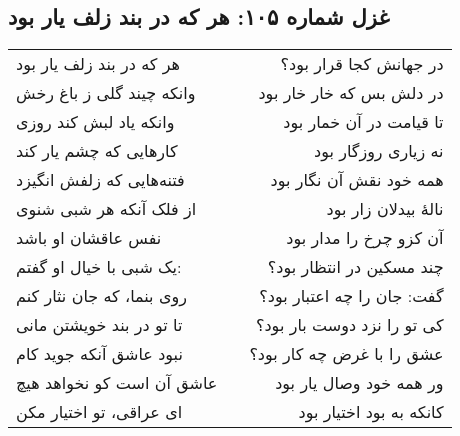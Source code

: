 \begin{center}
\section*{غزل شماره ۱۰۵: هر که در بند زلف یار بود}
\label{sec:105}
\begin{longtable}{l p{0.5cm} r}
هر که در بند زلف یار بود
&&
در جهانش کجا قرار بود؟
\\
وانکه چیند گلی ز باغ رخش
&&
در دلش بس که خار خار بود
\\
وانکه یاد لبش کند روزی
&&
تا قیامت در آن خمار بود
\\
کارهایی که چشم یار کند
&&
نه زیاری روزگار بود
\\
فتنه‌هایی که زلفش انگیزد
&&
همه خود نقش آن نگار بود
\\
از فلک آنکه هر شبی شنوی
&&
نالهٔ بیدلان زار بود
\\
نفس عاقشان او باشد
&&
آن کزو چرخ را مدار بود
\\
یک شبی با خیال او گفتم:
&&
چند مسکین در انتظار بود؟
\\
روی بنما، که جان نثار کنم
&&
گفت: جان را چه اعتبار بود؟
\\
تا تو در بند خویشتن مانی
&&
کی تو را نزد دوست بار بود؟
\\
نبود عاشق آنکه جوید کام
&&
عشق را با غرض چه کار بود؟
\\
عاشق آن است کو نخواهد هیچ
&&
ور همه خود وصال یار بود
\\
ای عراقی، تو اختیار مکن
&&
کانکه به بود اختیار بود
\\
\end{longtable}
\end{center}
